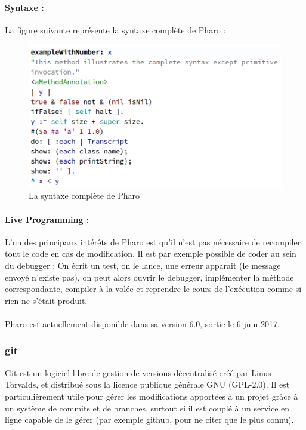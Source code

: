 	\paragraph{Syntaxe :}
	La figure suivante représente la syntaxe complète de Pharo :
	
	\begin{figure}
		\includegraphics[width=12cm]{./img/pharo_syntax.png}
		\caption[pharosyntax]{La syntaxe complète de Pharo}
	\end{figure}

	\paragraph{Live Programming :}
	L'un des principaux intérêts de Pharo est qu'il n'est pas nécessaire de recompiler tout le code en cas de modification. Il est par exemple possible de coder au sein du debugger : On écrit un test, on le lance, une erreur apparait (le message envoyé n'existe pas), on peut alors ouvrir le debugger, implémenter la méthode correspondante, compiler à la volée et reprendre le cours de l'exécution comme si rien ne s'était produit.
	
	\paragraph{}
	Pharo est actuellement disponible dans sa version 6.0, sortie le 6 juin 2017.

	\subsubsection{git}
	Git est un logiciel libre de gestion de versions décentralisé créé par Linus Torvalds, et distribué sous la licence publique générale GNU (GPL-2.0). Il est particulièrement utile pour gérer les modifications apportées à un projet grâce à un système de commits et de branches, surtout si il est couplé à un service en ligne capable de le gérer (par exemple github, pour ne citer que le plus connu).
